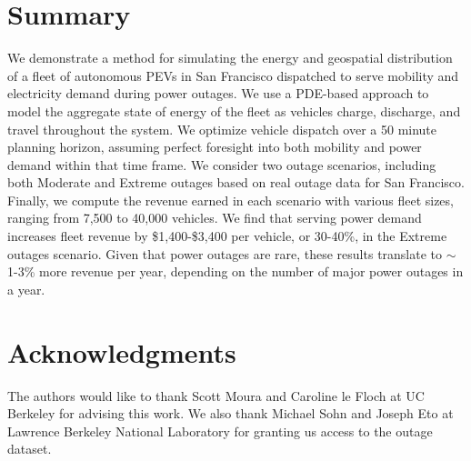\documentclass[conference]{IEEEtran}
\begin{document}
\section{Summary}
We demonstrate a method for simulating the energy and geospatial distribution of a fleet of autonomous PEVs in San Francisco dispatched to serve mobility and electricity demand during power outages. We use a PDE-based approach to model the aggregate state of energy of the fleet as vehicles charge, discharge, and travel throughout the system. We optimize vehicle dispatch over a 50 minute planning horizon, assuming perfect foresight into both mobility and power demand within that time frame. We consider two outage scenarios, including both Moderate and Extreme outages based on real outage data for San Francisco. Finally, we compute the revenue earned in each scenario with various fleet sizes, ranging from 7,500 to 40,000 vehicles. We find that serving power demand increases fleet revenue by \$1,400-\$3,400 per vehicle, or 30-40\%, in the Extreme outages scenario. Given that power outages are rare, these results translate to $\sim$1-3\% more revenue per year, depending on the number of major power outages in a year.

\section*{Acknowledgments}
The authors would like to thank Scott Moura and Caroline le Floch at UC Berkeley for advising this work. We also thank Michael Sohn and Joseph Eto at Lawrence Berkeley National Laboratory for granting us access to the outage dataset.


\end{document}

